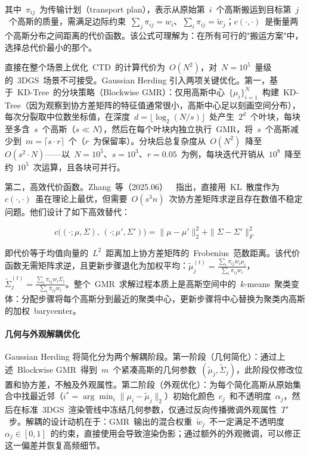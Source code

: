 其中~$\pi_{ij}$~为传输计划（transport plan），表示从原始第~$i$~个高斯搬运到目标第~$j$~个高斯的质量，需满足边际约束~$\sum_j \pi_{ij} = w_i$、$\sum_i \pi_{ij} = \tilde{w}_j$；$c(\cdot,\cdot)$~是衡量两个高斯分布之间距离的代价函数。该公式可理解为：在所有可行的"搬运方案"中，选择总代价最小的那个。

直接在整个场景上优化~CTD~的计算代价为~$O(N^2)$，对~$N = 10^5$~量级的~3DGS~场景不可接受。Gaussian Herding 引入两项关键优化。第一，基于~KD-Tree~的分块策略（Blockwise GMR）：仅用高斯中心~$\{\mu_i\}_{i=1}^N$~构建~KD-Tree（因为观察到协方差矩阵的特征值通常很小，高斯中心足以刻画空间分布），每次分裂取中位数坐标值，在深度~$d = \lfloor \log_2(N/s) \rfloor$~处产生~$2^d$~个叶块，每块至多含~$s$~个高斯（$s \ll N$），然后在每个叶块内独立执行~GMR，将~$s$~个高斯减少到~$m = \lceil s \cdot r \rceil$~个（$r$~为保留率）。分块后总复杂度从~$O(N^2)$~降至~$O(s^2 \cdot N)$——以~$N = 10^5$、$s = 10^3$、$r = 0.05$~为例，每块迭代开销从~$10^8$~降至约~$10^5$~次运算，且各块可并行。

第二，高效代价函数。Zhang~等（2025.06）~\cite{2506_09534}~指出，直接用~KL~散度作为~$c(\cdot,\cdot)$~虽在理论上最优，但需要~$O(s^3 n)$~次协方差矩阵求逆且存在数值不稳定问题。他们设计了如下高效替代：

\begin{equation}
c\bigl((\cdot;\mu,\Sigma),\, (\cdot;\mu',\Sigma')\bigr) = \|\mu - \mu'\|_2^2 + \|\Sigma - \Sigma'\|_F^2
\label{eq:ch11_efficient_cost}
\end{equation}

即代价等于均值向量的~$L^2$~距离加上协方差矩阵的~Frobenius~范数距离。该代价函数无需矩阵求逆，且更新步骤退化为加权平均：$\tilde{\mu}_j^{(t)} = \frac{\sum_i \pi_{ij} w_i \mu_i}{\sum_i \pi_{ij} w_i}$，$\tilde{\Sigma}_j^{(t)} = \frac{\sum_i \pi_{ij} w_i \Sigma_i}{\sum_i \pi_{ij} w_i}$。整个~GMR~求解过程本质上是高斯空间中的~$k$-means~聚类变体：分配步骤将每个高斯分到最近的聚类中心，更新步骤将中心替换为聚类内高斯的加权~barycenter。

\paragraph{几何与外观解耦优化}

Gaussian Herding 将简化分为两个解耦阶段。第一阶段（几何简化）：通过上述~Blockwise GMR~得到~$m$~个紧凑高斯的几何参数~$(\tilde{\mu}_j, \tilde{\Sigma}_j)$，此阶段仅修改位置和协方差，不触及外观属性。第二阶段（外观优化）：为每个简化高斯从原始集合中找最近邻（$i^* = \arg\min_i \|\mu_i - \tilde{\mu}_j\|_2$）初始化颜色~$c_j$~和不透明度~$\alpha_j$，然后在标准~3DGS~渲染管线中冻结几何参数，仅通过反向传播微调外观属性~$T'$~步。解耦的设计动机在于：GMR~输出的混合权重~$\tilde{w}_j$~不一定满足不透明度~$\alpha_j \in [0,1]$~的约束，直接使用会导致渲染伪影；通过额外的外观微调，可以修正这一偏差并恢复高频细节。

